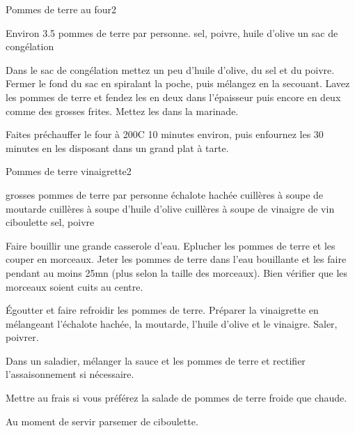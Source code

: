 \begin{recette}{Pommes de terre au four}{2}{}{}\label{sec:pomme-de-terre-four}
\begin{ingredients}
\ingredient Environ 3.5 pommes de terre par personne.
\ingredient sel, poivre, huile d'olive
\ingredient un sac de congélation
\end{ingredients}

\begin{preparation}
\etape Dans le sac de congélation mettez un peu d'huile d'olive, du sel et du poivre. Fermer le fond du sac en spiralant la poche, puis mélangez en la secouant.
\etape Lavez les pommes de terre et fendez les en deux dans l'épaisseur puis encore en deux comme des grosses frites.
\etape Mettez les dans la marinade.
\end{preparation}

\begin{cuisson}
Faites préchauffer le four à 200\degres C 10 minutes environ, puis enfournez les 30 minutes en les disposant dans un grand plat à tarte.
\end{cuisson}

\end{recette}

\begin{recette}{Pommes de terre vinaigrette}{2}{}{}
\begin{ingredients}
 grosses pommes de terre par personne
 échalote hachée
 cuillères à soupe de moutarde
 cuillères à soupe d'huile d'olive
 cuillères à soupe de vinaigre de vin
\ingredient ciboulette
\ingredient sel, poivre
\end{ingredients}

\begin{preparation}
\etape Faire bouillir une grande casserole d'eau. Eplucher les pommes de terre et les couper en morceaux. Jeter les pommes de terre dans l'eau bouillante et les faire pendant au moins 25mn (plus selon la taille des morceaux). Bien vérifier que les morceaux soient cuits au centre.

\etape Égoutter et faire refroidir les pommes de terre. Préparer la vinaigrette en mélangeant l'échalote hachée, la moutarde, l'huile d'olive et le vinaigre. Saler, poivrer.

\etape Dans un saladier, mélanger la sauce et les pommes de terre et rectifier l'assaisonnement si nécessaire.

\begin{remarque}
Mettre au frais si vous préférez la salade de pommes de terre froide que chaude.
\end{remarque}

\etape Au moment de servir parsemer de ciboulette.
\end{preparation}
\end{recette}

